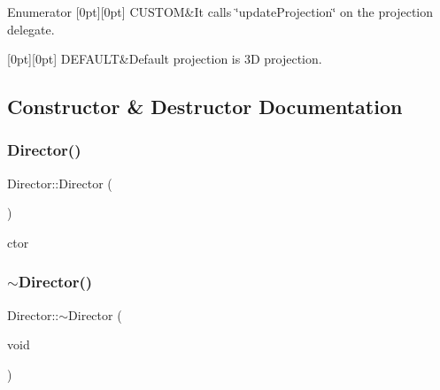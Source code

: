 \begin{DoxyEnumFields}{Enumerator}
[0pt][0pt]{}\mbox{\label{classDirector_aaa3d9a0eac7c805d87ecba67c974fcf2a72baef04098f035e8a320b03ad197818}} 
C\+U\+S\+T\+OM&It calls \char`\"{}update\+Projection\char`\"{} on the projection delegate. \\
\hline

[0pt][0pt]{}\mbox{\label{classDirector_aaa3d9a0eac7c805d87ecba67c974fcf2a5b39c8b553c821e7cddc6da64b5bd2ee}} 
D\+E\+F\+A\+U\+LT&Default projection is 3D projection. \\
\hline

\end{DoxyEnumFields}


\subsection{Constructor \& Destructor Documentation}
\mbox{\label{classDirector_a607a41fe5c42dd9ca7e256a11942a6d7}} 
\subsubsection{\texorpdfstring{Director()}{Director()}\hspace{0.1cm}{\footnotesize\ttfamily [1/2]}}
{\footnotesize\ttfamily Director\+::\+Director (\begin{DoxyParamCaption}{ }\end{DoxyParamCaption})}

ctor \mbox{\label{classDirector_a59d7a588bfd4edd22948a9e7fd8c854a}} 
\subsubsection{\texorpdfstring{$\sim$\+Director()}{~Director()}\hspace{0.1cm}{\footnotesize\ttfamily [1/2]}}
{\footnotesize\ttfamily Director\+::$\sim$\+Director (\begin{DoxyParamCaption}\item[{void}]{ }\end{DoxyParamCaption})\hspace{0.3cm}{\ttfamily [virtual]}}

